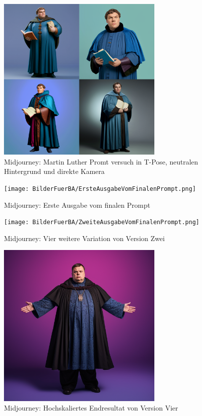 \begin{figure}
	\centering
	\includegraphics[width=8.022cm]{BilderFuerBA/MartinLutherInTPoseFirst.png}
	\caption{Midjourney: Martin Luther Promt versuch in T-Pose, neutralen Hintergrund und direkte Kamera}
	\label{MartinLutherInTPoseNeutralerHintergrundDirekteKamera}
\end{figure}

\begin{figure}
	\centering
	\texttt{[image: BilderFuerBA/ErsteAusgabeVomFinalenPrompt.png]}
	\caption{Midjourney: Erste Ausgabe vom finalen Prompt}
	\label{ErsteAusgabeVomFinalenPrompt}
\end{figure}

\begin{figure}
	\centering
	\texttt{[image: BilderFuerBA/ZweiteAusgabeVomFinalenPrompt.png]}
	\caption{Midjourney: Vier weitere Variation von Version Zwei}
	\label{ZweiteAusgabeVomFinalenPrompt}
\end{figure}

\begin{figure}
	\centering
	\includegraphics[width=8.022cm]{BilderFuerBA/DritteAusgabeVomFinalenPrompt.png}
	\caption{Midjourney: Hochskaliertes Endresultat von Version Vier}
	\label{DritteAusgabeVomFinalenPrompt}
\end{figure}

